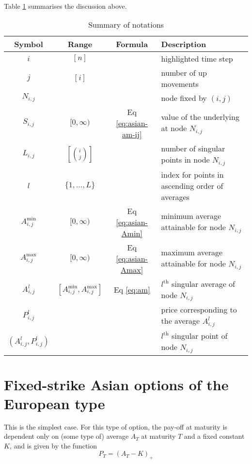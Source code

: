 Table \ref{tab:asian-notations} summarises the discussion above.

\begin{table}[h]
	\centering
	\caption{Summary of notations}
	\label{tab:asian-notations}
	\begin{tabular}{cccl}
		\toprule
		Symbol & Range & Formula & Description \\
		\midrule
		$ i $ & $ [ n ] $ & & highlighted time step \\
		$ j $ & $ [ i ] $ & & number of up movements \\
		$ N_{i,j} $ & & & node fixed by $ (i,j) $ \\
		$ S_{i,j} $ & $ [0, \infty) $ & Eq \ref{eq:asian-am-ij} & value of the underlying at node $ N_{i,j} $ \\
		$ L_{i,j} $ & $ \left[ \binom{i}{j} \right] $ & & number of singular points in node $ N_{i,j} $ \\
		$ l $ & $ \{ 1, \dots, L \} $ & & index for points in ascending order of averages \\
		$ A_{i,j}^{\min} $ & $ [0, \infty) $ & Eq \ref{eq:asian-Amin} & minimum average attainable for node $ N_{i,j} $ \\
		$ A_{i,j}^{\max} $ & $ [0, \infty) $ & Eq \ref{eq:asian-Amax} & maximum average attainable for node $ N_{i,j} $ \\
		$ A_{i,j}^l $ & $ \left[ A_{i,j}^{\min}, A_{i,j}^{\max} \right] $ & Eq \ref{eq:am} & $ l^\mathrm{th} $ singular average of node $ N_{i,j} $ \\
		$ P_{i,j}^l $ & & & price corresponding to the average $ A_{i,j}^l $ \\
		$ (A_{i,j}^l, P_{i,j}^l) $ & & & $ l^\mathrm{th} $ singular point of node $ N_{i,j} $ \\
		\bottomrule
	\end{tabular}
\end{table}



\section{Fixed-strike Asian options of the European type}
\label{sec:fixed-strike-eu}

This is the simplest case. For this type of option, the pay-off at maturity is dependent only on (some type of) average $ A_T $ at maturity $ T $ and a fixed constant $ K $, and is given by the function
\begin{equation}
	\label{eq:asian-price-eu-asian-am}
	P_T = (A_T - K)_+
\end{equation}

